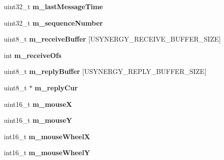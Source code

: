 \begin{DoxyCompactItemize}
\item 
\mbox{\label{structu_synergy_context_a7d46845ed639a31bb63eab72ecd04c07}} 
uint32\+\_\+t {\bfseries m\+\_\+last\+Message\+Time}
\item 
\mbox{\label{structu_synergy_context_afca9d94094a4f9aa788046fb56ca249e}} 
uint32\+\_\+t {\bfseries m\+\_\+sequence\+Number}
\item 
\mbox{\label{structu_synergy_context_a8cd642d7db03e94801b97acf722a10c6}} 
uint8\+\_\+t {\bfseries m\+\_\+receive\+Buffer} \mbox{[}U\+S\+Y\+N\+E\+R\+G\+Y\+\_\+\+R\+E\+C\+E\+I\+V\+E\+\_\+\+B\+U\+F\+F\+E\+R\+\_\+\+S\+I\+ZE\mbox{]}
\item 
\mbox{\label{structu_synergy_context_a4bf58e87d9208c193a0edd2c8bfd6f85}} 
int {\bfseries m\+\_\+receive\+Ofs}
\item 
\mbox{\label{structu_synergy_context_afe6b9f53f7d06f0e506da0b617cb8a7f}} 
uint8\+\_\+t {\bfseries m\+\_\+reply\+Buffer} \mbox{[}U\+S\+Y\+N\+E\+R\+G\+Y\+\_\+\+R\+E\+P\+L\+Y\+\_\+\+B\+U\+F\+F\+E\+R\+\_\+\+S\+I\+ZE\mbox{]}
\item 
\mbox{\label{structu_synergy_context_ad1dc39e2b0f344c92d37a6296131c1ad}} 
uint8\+\_\+t $\ast$ {\bfseries m\+\_\+reply\+Cur}
\item 
\mbox{\label{structu_synergy_context_a818c43c632850d2eb250d8cbfb76e69b}} 
uint16\+\_\+t {\bfseries m\+\_\+mouseX}
\item 
\mbox{\label{structu_synergy_context_a2f44ba5c12e66c1e43549de834975d80}} 
uint16\+\_\+t {\bfseries m\+\_\+mouseY}
\item 
\mbox{\label{structu_synergy_context_aa95376a5a7011a3fc027b6c0cce991cd}} 
int16\+\_\+t {\bfseries m\+\_\+mouse\+WheelX}
\item 
\mbox{\label{structu_synergy_context_ad22a33d731fdb8a1fceb4650fa3c8dc1}} 
int16\+\_\+t {\bfseries m\+\_\+mouse\+WheelY}
\item 

\end{DoxyCompactItemize}
